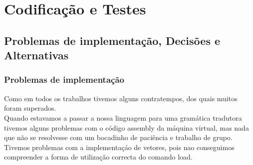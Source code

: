 \documentclass{report}
\begin{document}
\chapter{Codificação e Testes}
\section{Problemas de implementação, Decisões e Alternativas}
\subsection{Problemas de implementação}
\indent
Como em todos os trabalhos tivemos alguns contratempos, dos quais muitos foram superados.\\
\indent
Quando estavamos a passar a nossa linguagem para uma gramática tradutora tivemos alguns problemas com o código assembly da máquina virtual, mas nada que não se resolvesse com um bocadinho de paciência e trabalho de grupo. Tivemos problemas com a implementaçáo de vetores, pois nao conseguimos compreender a forma de utilização correcta do comando load.   
   
\end{document}
